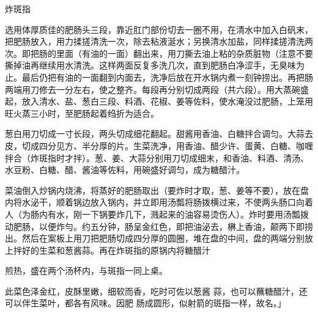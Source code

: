 \begin{recipe}{炸斑指}

\ingredients






\cooking

\step 选用体厚质佳的肥肠头三段，靠近肛门部份切去一圈不用，在清水中加入白矾末，把肥肠放入，用力揉搓清洗一次，除去粘液涎水；另换清水加盐，同样揉搓清洗两次。即把肠的里面（有油的一面）翻出来，用刀撕去油上粘的杂质脏物（注意不要撕掉油再继续用水清洗。这样两面反复多洗几次，直到肥肠白净涩手，无臭味为止。最后仍把有油的一面翻到内面去，洗净后放在开水锅内煮一刻钟捞出。再把肠两端用刀修去一分左右，使之整齐。每段再分别切成两段（共六段）。用大蒸碗盛起，放入清水、盐、葱白三段、料酒、花椒、姜等佐料，使水淹没过肥肠，上笼用旺火蒸三小时，至肥肠起着绉折为适合。

\step 葱白用刀切成一寸长段，两头切成细花翻起。甜酱用香油、白糖拌合调匀。大蒜去皮，切成四分见方、半分厚的片。生菜洗净，用香油、醋少许、蛋黄、白糖、咖喱拌合（炸斑指时才拌）。葱、姜、大蒜分别用刀切成细末，和香油、料酒、清汤、水豆粉、白糖、醋、酱油等佐料，用碗盛好调匀，成为糖醋汁。

\step 菜油倒入炒锅内烧沸，将蒸好的肥肠取出（要炸时才取，葱、姜等不要），放在盘内将水泌干，顺着锅边放入锅内，并立即用汤瓢将肠拨横过来，不使两头肠口向着人（为肠内有水，刚一下锅要炸几下，溅起来的油容易烫伤人）。炸时要用汤瓢拨动肥肠，以便炸勻。约五分钟，肠呈金红色，即把油泌去，楙上香油，颠两下即捞出。然后在案板上用刀把肥肠切成四分厚的圆圈，堆在盘的中间，盘的两端分别放上拌好的生菜和葱酱蒜。再在炸斑指的原锅内将糖醋汁

煎热，盛在两个汤杯内，与斑指一同上桌。

\notes

此菜色泽金红，皮酥里嫩，细软而香，吃时可佐以葱酱 蒜，也可以蘸糖醋汁，还可以伴生菜叶，都各有风味。因肥 肠成圆形，似射箭的斑指一样，故名。」

\end{recipe}

